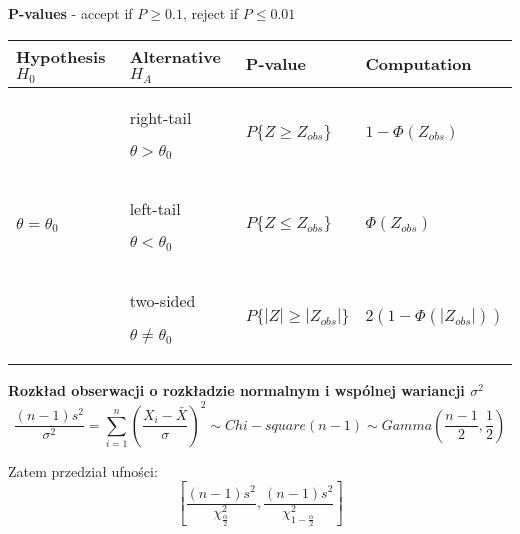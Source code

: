 \documentclass[a4paper]{article}
\begin{document}
    \textbf{P-values} - accept if $P \geq 0.1$, reject if $P \leq 0.01$
    \begin{table}[H]
        \begin{center}
            \begin{tabular}{ p{} |p{} |p{} |p{}}
                \toprule
                Hypothesis $H_0$ & Alternative $H_A$ & P-value & Computation\\
                \toprule
                \multirow{3}{*}{$\theta = \theta_0$} & right-tail

                $\theta > \theta_0$ & $P\{Z \geq Z_{obs}\}$ & $1 - \Phi(Z_{obs})$\\

                & left-tail

                $\theta < \theta_0$ & $P\{Z \leq Z_{obs}\}$ & $\Phi(Z_{obs})$\\

                & two-sided

                $\theta \neq \theta_0$ & $P\{|Z| \geq |Z_{obs}|\}$ & $2(1 - \Phi(|Z_{obs}|))$\\

                \bottomrule
            \end{tabular}
        \end{center}
    \end{table}

    \textbf{Rozkład obserwacji o rozkładzie normalnym i wspólnej wariancji $\sigma^2$}
    \begin{equation*}
        \frac{(n-1)s^2}{\sigma^2} = \sum_{i=1}^{n}(\frac{X_i - \bar{X}}{\sigma})^2 \sim Chi-square(n-1) \sim Gamma \left ( \frac{n-1}{2}, \frac{1}{2} \right )
    \end{equation*}

    Zatem przedział ufności:
    \begin{equation*}
        \left [ \frac{(n-1)s^2}{\chi^2_{\frac{\alpha}{2}}}, \frac{(n-1)s^2}{\chi_{1 - \frac{\alpha}{2}}^2} \right ]
    \end{equation*}
\end{document}
